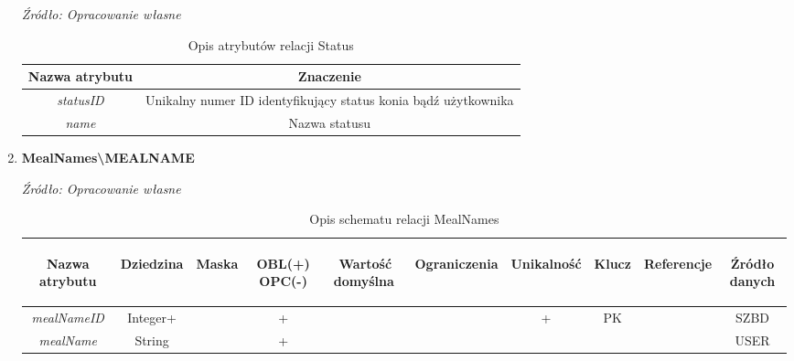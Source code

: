 \documentclass[12pt,oneside]{report}
\begin{document}
\begin{enumerate}[start=10,label={\bfseries REL\textbackslash\arabic*}]
	\begin{table}[H]
		\caption{Opis atrybutów relacji Status}
		\textit{Źródło: Opracowanie własne}
		\label{StatusAttributeDescription}
		\centering
		\begin{tabular}{|c|c|}
			\hline
			Nazwa atrybutu & Znaczenie \\
			\hline
		    \textit{statusID}&Unikalny numer ID identyfikujący status konia bądź użytkownika\\	
			\hline			
			\textit{name}& Nazwa statusu\\	
			\hline
		\end{tabular}
	\end{table}
	\item \textbf{MealNames\textbackslash MEALNAME} 
	\begin{table}[H]
		\caption{Opis schematu relacji MealNames}
		\textit{Źródło: Opracowanie własne}
		\label{MealNamesRelationSchema}
		\centering
		\begin{tabular}{|c|c|c|c|c|c|c|c|c|c|}
			\hline
			\begin{sideways}Nazwa atrybutu\end{sideways}& 
			\begin{sideways}Dziedzina \end{sideways}& 
			\begin{sideways}Maska \end{sideways}& 
			\begin{sideways}OBL(+) OPC(-)\end{sideways} & 
			\begin{sideways}Wartość domyślna$\ $\end{sideways}& 
			\begin{sideways}Ograniczenia\end{sideways} &
			\begin{sideways}Unikalność \end{sideways}& 
			\begin{sideways}Klucz \end{sideways}& 
			\begin{sideways}Referencje \end{sideways}&
			\begin{sideways}Źródło danych\end{sideways}\\
			\hline			
			\textit{mealNameID}&Integer+&&+&&&+&PK&&SZBD\\	
			\hline			
			\textit{mealName}&String&&+&&&&&&USER\\	
			\hline
		\end{tabular}
	\end{table}
	

\end{enumerate}
\end{document}
